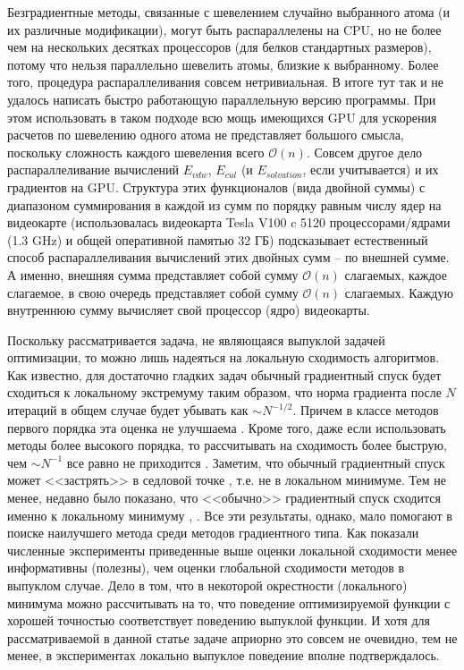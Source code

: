   Безградиентные методы, связанные с шевелением случайно выбранного атома (и их различные модификации), могут быть распараллелены на CPU, но не более чем на нескольких десятках процессоров (для белков стандартных размеров), потому что нельзя параллельно шевелить атомы, близкие к выбранному. Более того, процедура распараллеливания совсем нетривиальная. В итоге тут так и не удалось написать быстро работающую параллельную версию программы. При этом использовать в таком подходе всю мощь имеющихся GPU для ускорения расчетов по шевелению одного атома не представляет большого смысла, поскольку сложность каждого шевеления всего $\mathcal{O}\left( n \right)$. Совсем другое дело распараллеливание вычислений $E_{vdw}$, $E_{cul}$ (и $E_{solvation}$, если учитывается) и их градиентов на GPU. Структура этих функционалов (вида двойной суммы) с диапазоном суммирования в каждой из сумм по порядку равным числу ядер на видеокарте (использовалась видеокарта Tesla V100 c 5120 процессорами/ядрами (1.3 GHz) и общей оперативной памятью 32 ГБ) подсказывает естественный способ распараллеливания вычислений этих двойных сумм -- по внешней сумме. А именно, внешняя сумма представляет собой сумму $\mathcal{O}\left( n \right)$ слагаемых, каждое слагаемое, в свою очередь представляет собой сумму $\mathcal{O}\left( n \right)$ слагаемых. Каждую внутреннюю сумму вычисляет свой процессор (ядро) видеокарты. 

  Поскольку рассматривается задача, не являющаяся выпуклой задачей оптимизации, то можно лишь надеяться на локальную сходимость алгоритмов. Как известно, для достаточно гладких задач обычный градиентный спуск будет сходиться к локальному экстремуму таким образом, что норма градиента после $N$ итераций в общем случае будет убывать как $\sim N^{-1/2}$. Причем в классе методов первого порядка эта оценка не улучшаема  \cite{carmon2017lower2}. Кроме того, даже если использовать методы более высокого порядка, то рассчитывать на сходимость более быструю, чем $\sim N^{-1}$ все равно не приходится \cite{carmon2017lower1}. Заметим, что обычный градиентный спуск может <<застрять>> в седловой точке \cite{nesterov2013introductory}, т.е. не в локальном минимуме. Тем не менее, недавно было показано, что <<обычно>> градиентный спуск сходится именно к локальному минимуму \cite{lee2017first}, \cite{lee2016gradient}. Все эти результаты, однако, мало помогают в поиске наилучшего метода среди методов градиентного типа. Как показали численные эксперименты приведенные выше оценки локальной сходимости менее информативны (полезны), чем оценки глобальной сходимости методов в выпуклом случае. Дело в том, что в некоторой окрестности (локального) минимума можно рассчитывать на то, что поведение оптимизируемой функции с хорошей точностью соответствует поведению выпуклой функции. И хотя для рассматриваемой в  данной статье задаче априорно это совсем не очевидно, тем не менее, в экспериментах локально выпуклое поведение вполне подтверждалось.  

